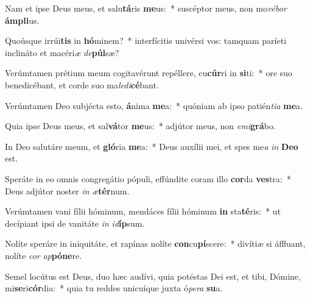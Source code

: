 \item Nam et ipse Deus meus, et salu\textbf{tá}ris \textbf{me}us:~* suscéptor meus, non mo\textit{vé}\textit{bor} \textbf{ám}\textbf{pli}us.
\item Quoúsque irrúi\textbf{tis} in \textbf{hó}minem?~* interfícitis univérsi vos: tamquam paríeti inclináto et macéri\textit{æ} \textit{de}\textbf{púl}sæ?
\item Verúmtamen prétium meum cogitavérunt repéllere, cu\textbf{cúr}ri in \textbf{si}ti:~* ore suo benedicébant, et corde suo ma\textit{le}\textit{di}\textbf{cé}bant.
\item Verúmtamen Deo subjécta esto, \textbf{á}nima \textbf{me}a:~* quóniam ab ipso patién\textit{ti}\textit{a} \textbf{me}a.
\item Quia ipse Deus meus, et sal\textbf{vá}tor \textbf{me}us:~* adjútor meus, non \textit{e}\textit{mi}\textbf{grá}bo.
\item In Deo salutáre meum, et \textbf{gló}ria \textbf{me}a:~* Deus auxílii mei, et spes me\textit{a} \textit{in} \textbf{De}\textbf{o} est.
\item Speráte in eo omnis congregátio pópuli, effúndite coram illo \textbf{cor}da \textbf{ves}tra:~* Deus adjútor noster \textit{in} \textit{æ}\textbf{tér}num.
\item Verúmtamen vani fílii hóminum, mendáces fílii hóminum \textbf{in} sta\textbf{té}ris:~* ut decípiant ipsi de vanitáte \textit{in} \textit{id}\textbf{íp}sum.
\item Nolíte speráre in iniquitáte, et rapínas nolíte \textbf{con}cu\textbf{pí}scere:~* divítiæ si áffluant, nolíte \textit{cor} \textit{ap}\textbf{pó}\textbf{ne}re.
\item Semel locútus est Deus, duo hæc audívi, quia potéstas Dei est, et tibi, Dómine, mi\textbf{se}ri\textbf{cór}dia:~* quia tu reddes unicuíque juxta ó\textit{pe}\textit{ra} \textbf{su}a.
